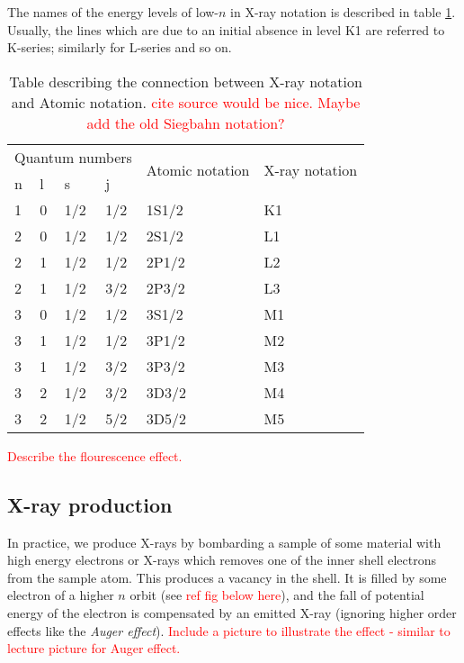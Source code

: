 \documentclass[11pt,a4paper,twoside,onecolumn]{article}
\newcommand{\reminder}[1]{\textcolor{red}{#1}}
\begin{document}
The names of the energy levels of low-$n$ in X-ray notation is described in table \ref{tab:x-ray-notation}. Usually, the lines which are due to an initial absence in level K1 are referred to K-series; similarly for L-series and so on.
\begin{table}[!htb]
    \centering
    \begin{tabular}{@{}llllll@{}}
    \toprule
    \multicolumn{4}{l}{Quantum numbers} & \multirow{2}{*}{Atomic notation} & \multirow{2}{*}{X-ray notation} \\ \cmidrule(r){1-4}
    n      & l      & s       & j       &                                  &                                 \\ \midrule
    1      & 0      & 1/2     & 1/2     & 1S1/2                            & K1                              \\
    2      & 0      & 1/2     & 1/2     & 2S1/2                            & L1                              \\
    2      & 1      & 1/2     & 1/2     & 2P1/2                            & L2                              \\
    2      & 1      & 1/2     & 3/2     & 2P3/2                            & L3                              \\
    3      & 0      & 1/2     & 1/2     & 3S1/2                            & M1                              \\
    3      & 1      & 1/2     & 1/2     & 3P1/2                            & M2                              \\
    3      & 1      & 1/2     & 3/2     & 3P3/2                            & M3                              \\
    3      & 2      & 1/2     & 3/2     & 3D3/2                            & M4                              \\
    3      & 2      & 1/2     & 5/2     & 3D5/2                            & M5                              \\ \bottomrule
    \end{tabular}
    \caption{Table describing the connection between X-ray notation and Atomic notation. \reminder{cite source would be nice. Maybe add the old Siegbahn notation?}}
    \label{tab:x-ray-notation}
\end{table}

\reminder{Describe the flourescence effect.}

\subsection{X-ray production}
In practice, we produce X-rays by bombarding a sample of some material with high energy electrons or X-rays which removes one of the inner shell electrons from the sample atom. This produces a vacancy in the shell. It is filled by some electron of a higher $n$ orbit (see \reminder{ref fig below here}), and the fall of potential energy of the electron is compensated by an emitted X-ray (ignoring higher order effects like the \emph{Auger effect}).
\reminder{Include a picture to illustrate the effect - similar to lecture picture for Auger effect.}
\end{document}
